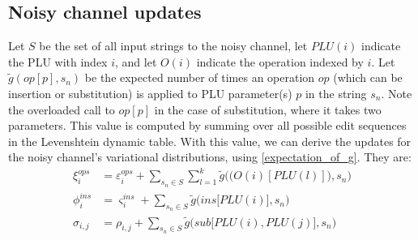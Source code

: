 \documentclass[12pt,letterpaper]{article}
\begin{document}
\subsection{Noisy channel updates}
Let $S$ be the set of all input strings to the noisy channel, let $PLU(i)$ indicate the PLU with index $i$, and let $O(i)$ indicate the operation indexed by $i$. Let $\tilde g(op[p], s_n)$ be the expected number of times an operation $op$ (which can be insertion or substitution) is applied to PLU parameter(s) $p$ in the string $s_n$. Note the overloaded call to $op[p]$ in the case of substitution, where it takes two parameters. This value is computed by summing over all possible edit sequences in the Levenshtein dynamic table. With this value, we can derive the updates for the noisy channel's variational distributions, using \eqref{expectation_of_g}. They are:
\begin{align*}
\nonumber \xi^{ops}_i &= \varepsilon^{ops}_i + \sum\limits_{s_n \in S}\sum\limits_{l = 1}^k \tilde g\Big(\big( O(i)[PLU(l)]\big), s_n\Big) \\
\nonumber \phi^{ins}_i &= \varsigma^{ins}_i + \sum\limits_{s_n \in S} \tilde g\Big(ins\big[PLU(i)\big], s_n\Big)\\
\nonumber \sigma_{i,j} &= \rho_{i,j} + \sum\limits_{s_n \in S} \tilde g\Big(sub\big[PLU(i), PLU(j)\big], s_n\Big)
\end{align*}



\appendix




\newpage 



\end{document}
